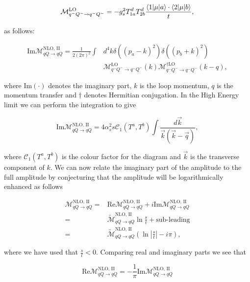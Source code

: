 		\begin{equation}
			\mathcal{M}_{q^-Q^-\rightarrow q^-Q^-}^{\text{LO}} = -g_s^2T^d_{1a}T^d_{2b}\frac{\langle 1 | \mu | a \rangle\cdot\langle 2 | \mu | b \rangle}{t},
		\end{equation}

		as follows:

		\begin{align}
			\text{Im}\mathcal{M}_{qQ\rightarrow qQ}^{\text{NLO, II}} = \frac{1}{2(2\pi)^2}\int &d^4k\delta((p_a-k)^2)
			\delta((p_b+k)^2)\\ &\mathcal{M}_{q^-Q^-\rightarrow q^-Q^-}^{\text{LO}}(k)
			\mathcal{M}_{q^-Q^-\rightarrow q^-Q^-}^{\dagger\text{LO}}(k-q),
		\end{align}

		where $\text{Im}(\cdot)$ denotes the imaginary part, $k$ is the loop momentum, $q$ is the momentum
		transfer and $\dagger$ denotes Hermitian conjugation.  In the High Energy limit we can perform the
		integration to give

		\begin{equation}
			\text{Im}\mathcal{M}_{qQ\rightarrow qQ}^{\text{NLO, II}} = 4\alpha_s^2 s\mathcal{C}_1(T^a,T^b)
			\int \frac{d\vec{k}}{\vec{k}(\vec{k} - \vec{q})},
		\end{equation}

		where $\mathcal{C}_1(T^a,T^b)$ is the colour factor for the diagram and $\vec{k}$ is the transverse
		component of $k$.  We can now relate the imaginary part of the amplitude to the full amplitude by
		conjecturing that the amplitude will be logarithmically enhanced as follows

		\begin{align}
			\mathcal{M}_{qQ\rightarrow qQ}^{\text{NLO, II}} = &\text{Re}\mathcal{M}_{qQ\rightarrow qQ}^{\text{NLO, II}} +
			i\text{Im}\mathcal{M}_{qQ\rightarrow qQ}^{\text{NLO, II}}\\
			=&\widetilde{\mathcal{M}}_{qQ\rightarrow qQ}^{\text{NLO, II}}\ln\frac{s}{t} + \text{sub-leading}\\
			=&\widetilde{\mathcal{M}}_{qQ\rightarrow qQ}^{\text{NLO, II}}\left(\ln\left|\frac{s}{t}\right| -i\pi\right),
		\end{align}

		where we have used that $\frac{s}{t} < 0$.  Comparing real and imaginary parts we see that

		\begin{equation}
			\text{Re}\mathcal{M}_{qQ\rightarrow qQ}^{\text{NLO, II}} = -\frac{1}{\pi}\text{Im}\mathcal{M}_{qQ\rightarrow qQ}^{\text{NLO, II}}
		\end{equation}

